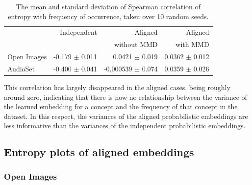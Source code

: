 \begin{table}[H]
\centering
\begin{tabular}{lrrr}
\toprule
       &   Independent & Aligned     &  Aligned  \\
       &               & without MMD &  with MMD \\
\midrule
Open Images    &  -0.179 $\pm$ 0.011 & 0.0421 $\pm$ 0.019 &     0.0362 $\pm$  0.012 \\
AudioSet    &  -0.400 $\pm$ 0.041 & -0.000539 $\pm$   0.074 &      0.0359  $\pm$ 0.026  \\
\bottomrule
\end{tabular}
\caption{\label{table:entropiescorr} The mean and standard deviation of Spearman correlation of entropy with frequency of occurrence, taken over 10 random seeds.}
\end{table}

This correlation has largely disappeared in the aligned cases, being roughly around zero, indicating that there is now no relationship between the variance of the learned embedding for a concept and the frequency of that concept in the dataset. In this respect, the variances of the aligned probabilistic embeddings are less informative than the variances of the independent probabilistic embeddings. 

\subsection{Entropy plots of aligned embeddings}

\subsubsection{Open Images}

